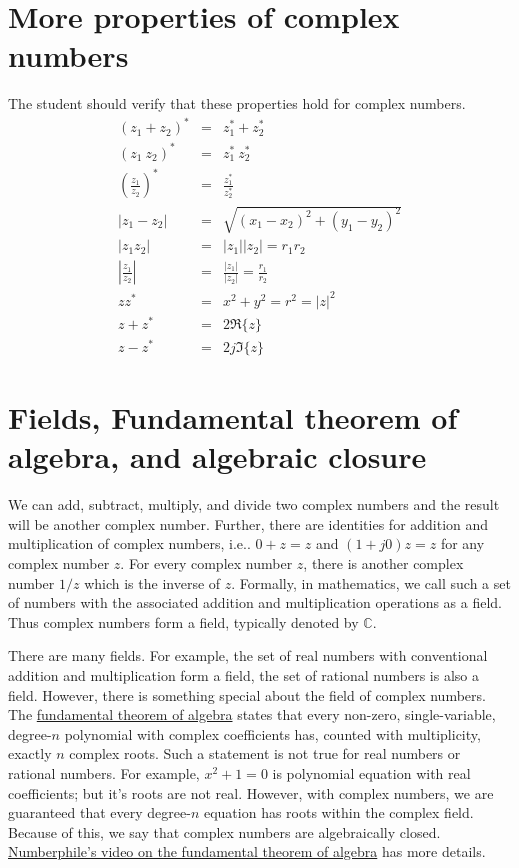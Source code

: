 \section{More properties of complex numbers}
The student should verify that these properties hold for complex numbers.
\begin{eqnarray}
\nonumber (z_1+z_2)^* & = & z_1^* + z_2^*\\
\nonumber (z_1 \ z_2)^* & = & z_1^* \ z_2^* \\
\nonumber \left(\frac{z_1}{z_2}\right)^* & = & \frac{z_1^*}{z_2^*} \\
\nonumber |z_1-z_2| &=& \sqrt{(x_1-x_2)^2+(y_1-y_2)^2}\\
\nonumber |z_1z_2| &=& |z_1||z_2| = r_1 r_2 \\
\nonumber \left|\frac{z_1}{z_2}\right| &=& \frac{|z_1|}{|z_2|} = \frac{r_1}{r_2}\\
\nonumber z z^* &=& x^2 + y^2 = r^2 = |z|^2\\
\nonumber z + z^* & = & 2 \Re\{z\} \\
\nonumber z - z^* & = & 2 j \Im \{z\}
\end{eqnarray}

\section{Fields, Fundamental theorem of algebra, and algebraic closure}
\label{sec:algebraicclosure}
We can add, subtract, multiply, and divide two complex numbers and the result will be another complex number. Further, there are identities for addition and multiplication of complex numbers, i.e.. $0+z = z$ and $(1+j0) z = z$ for any complex number $z$. For every complex number $z$,
there is another complex number $1/z$ which is the inverse of $z$. Formally, in mathematics, we call such a set of numbers with the associated addition and multiplication operations as a field. Thus complex numbers form a field, typically denoted by
$\mathbb{C}$.

There are many fields. For example, the set of real numbers with conventional addition and multiplication form a field, the set of rational numbers is also a field.
However, there is something special about the field of complex numbers.
The \href{https://en.wikipedia.org/wiki/Fundamental_theorem_of_algebra}{fundamental theorem of algebra} states that every non-zero, single-variable, degree-$n$ polynomial with complex coefficients has, counted with multiplicity, exactly $n$ complex roots.
Such a statement is not true for real numbers or rational numbers. For example,
$x^2+1 = 0$ is polynomial equation with real coefficients; but it's roots are not real.
However, with complex numbers, we are guaranteed that every degree-$n$ equation has roots
within the complex field. Because of this, we say that complex numbers are algebraically closed. \href{https://www.youtube.com/watch?v=shEk8sz1oOw}{Numberphile's video on the fundamental theorem of algebra} has more details.

